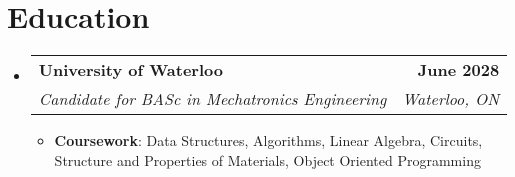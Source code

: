 \documentclass[letterpaper]{article}
\makeatletter
\newcommand{\resumeItem}[1]{
  \item\small{
    {#1 \vspace{-2pt}}
  }
}
\newcommand{\resumeSubheading}[4]{
  \vspace{-2pt}\item
    \begin{tabular*}{0.97\textwidth}[t]{l@{\extracolsep{\fill}}r}
      \textbf{#1} & #2 \\
      \textit{\small#3} & \textit{\small #4} \\
    \end{tabular*}\vspace{-7pt}
}
\newcommand{\resumeSubHeadingListStart}{\begin{itemize}[leftmargin=0.15in, label={}]}
\newcommand{\resumeSubHeadingListEnd}{\end{itemize}}
\newcommand{\resumeItemListStart}{\begin{itemize}}
\newcommand{\resumeItemListEnd}{\end{itemize}\vspace{-5pt}}
\makeatother
\begin{document}
\section{Education}
\resumeSubHeadingListStart
  \resumeSubheading
    {University of Waterloo}{\textbf{June 2028}}
    {Candidate for BASc in Mechatronics Engineering}{Waterloo, ON}
    \resumeItemListStart
      \resumeItem{\textbf{Coursework}: Data Structures, Algorithms, Linear Algebra, Circuits, Structure and Properties of Materials, Object Oriented Programming}
    \resumeItemListEnd
\resumeSubHeadingListEnd


\end{document}
